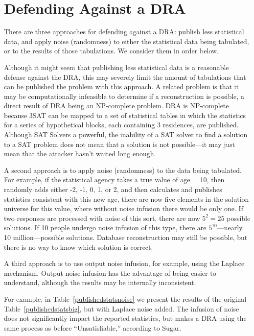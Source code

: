 \documentclass[runningheads]{llncs}
\begin{document}
\section{Defending Against a DRA}
There are three approaches for defending against a DRA: publish less
statistical data, and apply noise (randomness) to either the
statistical data being tabulated, or to the results of those
tabulations. We consider them in order below.

Although it might seem that publishing less statistical data is a
reasonable defense against the DRA, this may severely limit the amount
of tabulations that can be published the problem with this approach. A
related problem is that it may be computationally infeasible to
determine if a reconstruction is possible, a direct result of DRA being an NP-complete
problem. DRA is NP-complete because 3SAT can be mapped to a set of
statistical tables in which the statistics for a series of
hypothetical blocks, each containing 3 residences, are
published. Although SAT Solvers a powerful, the inability of a SAT
solver to find a solution to a SAT problem does not mean that a
solution is not possible---it may just mean that the attacker hasn't waited
long enough. 

A second approach is to apply noise (randomness) to the data being
tabulated. For example, if the statistical agency takes a true
value of age = 10, then randomly adds either -2, -1, 0, 1, or 2, and
then calculates and publishes statistics consistent with this new age,
there are now five elements in the solution universe for this value,
where without noise infusion there would be only one. If two responses
are processed with noise of this sort, there are now $5^2 = 25$
possible solutions. If 10 people undergo noise infusion of this type,
there are $5^{10}$---nearly 10 million---possible
solutions. Database reconstruction may still be possible, but there is no
way to know which solution is correct. 

A third approach is to use output noise infusion, for example, using
the Laplace mechanism\cite{Dwork:2006:CNS:2180286.2180305}. Output
noise infusion has the advantage of being easier to understand,
although the results may be internally inconsistent. 

For example, in Table~\ref{publishedstatsnoise} we present the results
of the original Table~\ref{publishedstatsbig}, but with Laplace noise
added.  The infusion of noise does not
significantly impact the reported statistics, but makes a DRA using
the same process as before ``Unsatisfiable,'' according to Sugar. 
\end{document}
